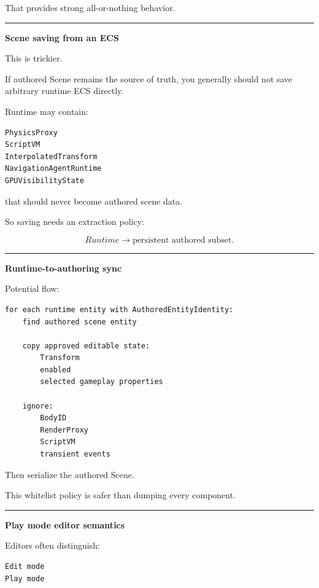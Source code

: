 That provides strong all-or-nothing behavior.

\begin{center}\rule{0.5\linewidth}{0.5pt}\end{center}

\textbf{Scene saving from an ECS}

This is trickier.

If authored Scene remains the source of truth, you generally should not save arbitrary runtime ECS directly.

Runtime may contain:

\begin{verbatim}
PhysicsProxy
ScriptVM
InterpolatedTransform
NavigationAgentRuntime
GPUVisibilityState
\end{verbatim}

that should never become authored scene data.

So saving needs an extraction policy:

\[
Runtime
\rightarrow
\text{persistent authored subset}.
\]

\begin{center}\rule{0.5\linewidth}{0.5pt}\end{center}

\textbf{Runtime-to-authoring sync}

Potential flow:

\begin{verbatim}
for each runtime entity with AuthoredEntityIdentity:
    find authored scene entity

    copy approved editable state:
        Transform
        enabled
        selected gameplay properties

    ignore:
        BodyID
        RenderProxy
        ScriptVM
        transient events
\end{verbatim}

Then serialize the authored Scene.

This whitelist policy is safer than dumping every component.

\begin{center}\rule{0.5\linewidth}{0.5pt}\end{center}

\textbf{Play mode editor semantics}

Editors often distinguish:

\begin{verbatim}
Edit mode
Play mode
\end{verbatim}


